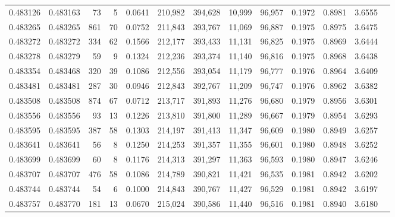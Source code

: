 \begin{tabular}{rrrrrrrrrrrrr}
0.483126 & 0.483163 &    73 &     5 &                                     0.0641 & 210,982 & 394,628 &  10,999 &  96,957 & 0.1972 & 0.8981 & 3.6555 \\
0.483265 & 0.483265 &   861 &    70 &                                     0.0752 & 211,843 & 393,767 &  11,069 &  96,887 & 0.1975 & 0.8975 & 3.6475 \\
0.483272 & 0.483272 &   334 &    62 &                                     0.1566 & 212,177 & 393,433 &  11,131 &  96,825 & 0.1975 & 0.8969 & 3.6444 \\
0.483278 & 0.483279 &    59 &     9 &                                     0.1324 & 212,236 & 393,374 &  11,140 &  96,816 & 0.1975 & 0.8968 & 3.6438 \\
0.483354 & 0.483468 &   320 &    39 &                                     0.1086 & 212,556 & 393,054 &  11,179 &  96,777 & 0.1976 & 0.8964 & 3.6409 \\
0.483481 & 0.483481 &   287 &    30 &                                     0.0946 & 212,843 & 392,767 &  11,209 &  96,747 & 0.1976 & 0.8962 & 3.6382 \\
0.483508 & 0.483508 &   874 &    67 &                                     0.0712 & 213,717 & 391,893 &  11,276 &  96,680 & 0.1979 & 0.8956 & 3.6301 \\
0.483556 & 0.483556 &    93 &    13 &                                     0.1226 & 213,810 & 391,800 &  11,289 &  96,667 & 0.1979 & 0.8954 & 3.6293 \\
0.483595 & 0.483595 &   387 &    58 &                                     0.1303 & 214,197 & 391,413 &  11,347 &  96,609 & 0.1980 & 0.8949 & 3.6257 \\
0.483641 & 0.483641 &    56 &     8 &                                     0.1250 & 214,253 & 391,357 &  11,355 &  96,601 & 0.1980 & 0.8948 & 3.6252 \\
0.483699 & 0.483699 &    60 &     8 &                                     0.1176 & 214,313 & 391,297 &  11,363 &  96,593 & 0.1980 & 0.8947 & 3.6246 \\
0.483707 & 0.483707 &   476 &    58 &                                     0.1086 & 214,789 & 390,821 &  11,421 &  96,535 & 0.1981 & 0.8942 & 3.6202 \\
0.483744 & 0.483744 &    54 &     6 &                                     0.1000 & 214,843 & 390,767 &  11,427 &  96,529 & 0.1981 & 0.8942 & 3.6197 \\
0.483757 & 0.483770 &   181 &    13 &                                     0.0670 & 215,024 & 390,586 &  11,440 &  96,516 & 0.1981 & 0.8940 & 3.6180 \\

\end{tabular}
